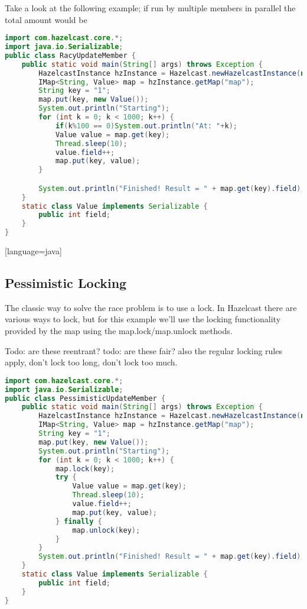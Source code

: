 Take a look at the following example; if run by multiple members in parallel the total amount would be 
\begin{lstlisting}[language=java]
import com.hazelcast.core.*;
import java.io.Serializable;
public class RacyUpdateMember {
    public static void main(String[] args) throws Exception {
        HazelcastInstance hzInstance = Hazelcast.newHazelcastInstance(null);
        IMap<String, Value> map = hzInstance.getMap("map");
        String key = "1";
        map.put(key, new Value());
        System.out.println("Starting");
        for (int k = 0; k < 1000; k++) {
            if(k%100 == 0)System.out.println("At: "+k);
            Value value = map.get(key);
            Thread.sleep(10);
            value.field++;
            map.put(key, value);
        }

        System.out.println("Finished! Result = " + map.get(key).field);
    }
    static class Value implements Serializable {
        public int field;
    }
}
\end{lstlisting}[language=java]

\subsection{Pessimistic Locking}
The classic way to solve the race problem is to use a lock. In Hazelcast there are various ways to lock, but for this example we'll use the locking functionality provided by the map using the map.lock/map.unlock methods.

Todo: are these reentrant?
todo: are these fair?
also the regular locking rules apply, don't lock too long, don't lock too much.

\begin{lstlisting}[language=java]
import com.hazelcast.core.*;
import java.io.Serializable;
public class PessimisticUpdateMember {
    public static void main(String[] args) throws Exception {
        HazelcastInstance hzInstance = Hazelcast.newHazelcastInstance(null);
        IMap<String, Value> map = hzInstance.getMap("map");
        String key = "1";
        map.put(key, new Value());
        System.out.println("Starting");
        for (int k = 0; k < 1000; k++) {
            map.lock(key);
            try {
                Value value = map.get(key);
                Thread.sleep(10);
                value.field++;
                map.put(key, value);
            } finally {
                map.unlock(key);
            }
        }
        System.out.println("Finished! Result = " + map.get(key).field);
    }
    static class Value implements Serializable {
        public int field;
    }
}
\end{lstlisting}


